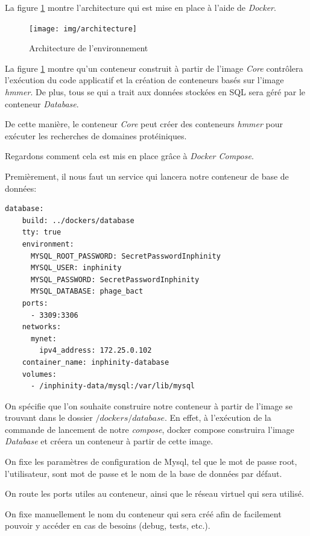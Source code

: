 La figure \ref{fig:architecture} montre l'architecture qui est mise en place à l'aide de \emph{Docker}.

\begin{figure}[H] 
\centering 
\texttt{[image: img/architecture]} 
\caption[architecture]{Architecture de l'environnement}
\label{fig:architecture} 
\end{figure}

La figure \ref{fig:architecture} montre qu'un conteneur construit à partir de l'image \emph{Core} contrôlera l'exécution du code applicatif et la création de conteneurs basés sur l'image \emph{hmmer}. De plus, tous se qui a trait aux données stockées en SQL sera géré par le conteneur \emph{Database}.

De cette manière, le conteneur \emph{Core} peut créer des conteneurs \emph{hmmer} pour exécuter les recherches de domaines protéiniques.

Regardons comment cela est mis en place grâce à \emph{Docker Compose}. 

Premièrement, il nous faut un service qui lancera notre conteneur de base de données:

\begin{lstlisting}[frame=single]
database:
    build: ../dockers/database
    tty: true
    environment:
      MYSQL_ROOT_PASSWORD: SecretPasswordInphinity
      MYSQL_USER: inphinity
      MYSQL_PASSWORD: SecretPasswordInphinity
      MYSQL_DATABASE: phage_bact
    ports:
      - 3309:3306
    networks:
      mynet:
        ipv4_address: 172.25.0.102
    container_name: inphinity-database
    volumes:
      - /inphinity-data/mysql:/var/lib/mysql
\end{lstlisting}

On spécifie que l'on souhaite construire notre conteneur à partir de l'image se trouvant dans le dossier \emph{$/dockers/database$}. En effet, à l'exécution de la commande de lancement de notre \emph{compose}, docker compose construira l'image \emph{Database} et créera un conteneur à partir de cette image.

On fixe les paramètres de configuration de Mysql, tel que le mot de passe root, l'utilisateur, sont mot de passe et le nom de la base de données par défaut.

On route les ports utiles au conteneur, ainsi que le réseau virtuel qui sera utilisé.

On fixe manuellement le nom du conteneur qui sera créé afin de facilement pouvoir y accéder en cas de besoins (debug, tests, etc.).

